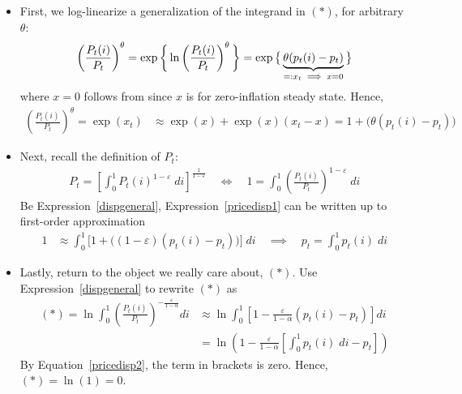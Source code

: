 \documentclass[12pt]{article}
\theoremstyle{plain}
\theoremstyle{definition}
\theoremstyle{remark}
\begin{document}
\begin{itemize}
  \item First, we log-linearize a generalization of the
    integrand in $(*)$, for arbitrary $\theta$:
    \begin{align*}
      \left(\frac{P_t(i)}{P_t}\right)^\theta
      =\exp\bigg\{
      \ln \left(\frac{P_t(i)}{P_t}\right)^\theta
      \bigg\}
      =\exp\big\{
      \underbrace{%
      \theta(p_t(i)-p_t)
      }_{=:x_t \;\implies\; x=0}
      \big\}
    \end{align*}
    where $x=0$ follows from since $x$ is for zero-inflation
    steady state. Hence,
    \begin{align}
      \left(\frac{P_t(i)}{P_t}\right)^\theta
      = \exp(x_t)
      &\approx \exp(x) + \exp(x)(x_t-x)
      = 1 + \big( \theta(p_t(i)-p_t) \big)
      \label{dispgeneral}
    \end{align}

  \item Next, recall the definition of $P_t$:
    \begin{align}
      P_t =
      \left[
      \int_0^1
      P_t(i)^{1-\varepsilon}\;di
      \right]^{\frac{1}{1-\varepsilon}}
      \quad\iff\quad
      1 =
      \int_0^1
      \left(\frac{P_t(i)}{P_t}\right)^{1-\varepsilon}\;di
      \label{pricedisp1}
    \end{align}
    Be Expression~\ref{dispgeneral}, Expression~\ref{pricedisp1}
    can be written up to first-order approximation
    \begin{align}
      1
      &\approx
      \int_0^1
      \big[
      1 + \big( (1-\varepsilon)(p_t(i)-p_t) \big)
      \big]
      \; di
      \quad\implies\quad
      p_t =
      \int_0^1
      p_t(i)
      \; di
      \label{pricedisp2}
    \end{align}

  \item Lastly, return to the object we really care about,
    $(*)$. Use Expression~\ref{dispgeneral} to rewrite
    $(*)$ as
    \begin{align*}
      (*)=
      \ln
      \int_0^1
      \left( \frac{P_t(i)}{P_t} \right)^{-\frac{\varepsilon}{1-\alpha}}
      di
      &\approx
      \ln
      \int_0^1
      \left[
      1
      -\frac{\varepsilon}{1-\alpha}
      (p_t(i)-p_t)
      \right]di
      \\
      &=
      \ln\left(
      1-
      \frac{\varepsilon}{1-\alpha}
      \left[
      \int_0^1
      p_t(i)
      \;di
      - p_t
      \right]
      \right)
    \end{align*}
    By Equation~\ref{pricedisp2}, the term in brackets is zero.
    Hence, $(*)=\ln(1)=0$.
\end{itemize}
\end{document}
